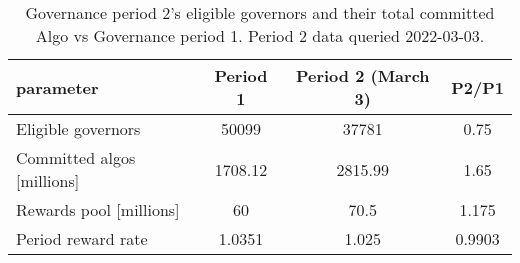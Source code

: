 %
\begin{longtable}[c]{ l c c c }
\caption{Governance period 2's eligible governors and their total committed Algo vs Governance period 1. Period 2 data queried 2022-03-03.} \\
\hline
\textbf{parameter} & \textbf{Period 1} & \textbf{Period 2 (March 3)} & \textbf{P2/P1} \\
\hline

Eligible governors & 50099 & 37781 & 0.75 \\
Committed algos [millions] & 1708.12 & 2815.99 & 1.65 \\
Rewards pool [millions] & 60 & 70.5 & 1.175 \\
Period reward rate & 1.0351 & 1.025 & 0.9903 \\
\hline
\end{longtable} 

